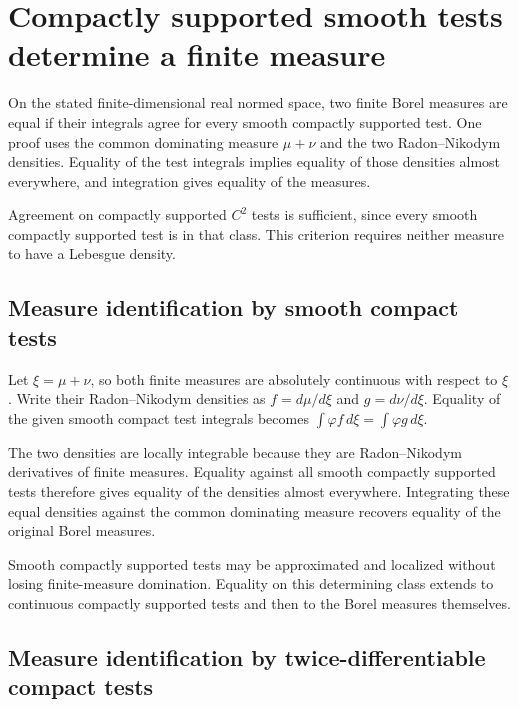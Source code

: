 \documentclass[11pt,a4paper]{report}
\begin{document}
\section{\texorpdfstring{Compactly supported smooth tests determine a finite measure}{Compactly supported smooth tests determine a finite measure}}
\label{proof-module-UnadjustedLangevin-TestMeasure-lean}


On the stated finite-dimensional real normed space, two finite Borel measures are equal if their integrals agree for every smooth compactly supported test. One proof uses the common dominating measure \(\mu+\nu\) and the two Radon–Nikodym densities. Equality of the test integrals implies equality of those densities almost everywhere, and integration gives equality of the measures.



Agreement on compactly supported \(C^2\) tests is sufficient, since every smooth compactly supported test is in that class. This criterion requires neither measure to have a Lebesgue density.

\subsection{\texorpdfstring{Measure identification by smooth compact tests}{Measure identification by smooth compact tests}}
\label{report-step-UnadjustedLangevin-TestMeasure-lean-1}


Let \(\xi=\mu+\nu\), so both finite measures are absolutely continuous with respect to \(\xi\). Write their Radon–Nikodym densities as \(f=d\mu/d\xi\) and \(g=d\nu/d\xi\). Equality of the given smooth compact test integrals becomes \(\int\varphi f\,d\xi=\int\varphi g\,d\xi\).



The two densities are locally integrable because they are Radon–Nikodym derivatives of finite measures. Equality against all smooth compactly supported tests therefore gives equality of the densities almost everywhere. Integrating these equal densities against the common dominating measure recovers equality of the original Borel measures.



Smooth compactly supported tests may be approximated and localized without losing finite-measure domination. Equality on this determining class extends to continuous compactly supported tests and then to the Borel measures themselves.

\subsection{\texorpdfstring{Measure identification by twice-differentiable compact tests}{Measure identification by twice-differentiable compact tests}}
\label{report-step-UnadjustedLangevin-TestMeasure-lean-2}
\end{document}
